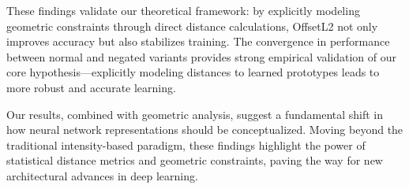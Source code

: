 These findings validate our theoretical framework: by explicitly modeling geometric constraints through direct distance calculations, OffsetL2 not only improves accuracy but also stabilizes training. The convergence in performance between normal and negated variants provides strong empirical validation of our core hypothesis—explicitly modeling distances to learned prototypes leads to more robust and accurate learning.

Our results, combined with geometric analysis, suggest a fundamental shift in how neural network representations should be conceptualized. Moving beyond the traditional intensity-based paradigm, these findings highlight the power of statistical distance metrics and geometric constraints, paving the way for new architectural advances in deep learning.

